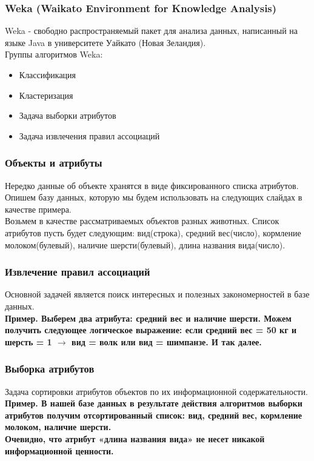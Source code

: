 \documentclass{beamer}
\begin{document}
\begin{frame}
\frametitle{Weka (Waikato Environment for Knowledge Analysis)}
Weka - свободно распространяемый пакет для анализа данных,
написанный на языке Java в университете Уайкато (Новая Зеландия). \\

\vspace{1cm}
Группы алгоритмов Weka:
\begin{itemize}
\item{Классификация}
\item{Кластеризация}
\item{Задача выборки атрибутов}
\item{Задача извлечения правил ассоциаций}
\end{itemize}

\end{frame}

\begin{frame}
\frametitle{Объекты и атрибуты}
Нередко данные  об объекте хранятся в виде фиксированного списка атрибутов.\\
\vspace{1cm}
Опишем базу данных, которую мы будем использовать на следующих слайдах в качестве примера.\\
\vspace{1cm}
Возьмем в качестве рассматриваемых объектов разных животных.
Список атрибутов пусть будет следующим:
вид(строка), средний вес(число), кормление молоком(булевый), наличие шерсти(булевый), длина названия вида(число).
\end{frame}
\begin{frame}
\frametitle{Извлечение правил ассоциаций}
Основной задачей является поиск интересных и полезных закономерностей в базе данных.\\
\vspace{1cm}
\bf{Пример.}
Выберем два атрибута: средний вес и наличие шерсти.
Можем получить следующее логическое выражение: 
если средний вес = 50 кг и шерсть = 1  $\to$ вид = волк или вид = шимпанзе.
И так далее.

\end{frame}
\begin{frame}
\frametitle{Выборка атрибутов}
Задача сортировки атрибутов объектов по их информационной содержательности.\\
\vspace{1cm}
\bf{Пример.}
\vspace{1cm}
В нашей базе данных в результате действия алгоритмов выборки атрибутов получим отсортированный список: вид, средний вес, кормление молоком, наличие шерсти.\\
Очевидно, что атрибут «длина названия вида» не несет никакой информационной ценности.
\end{frame}
\end{document}
